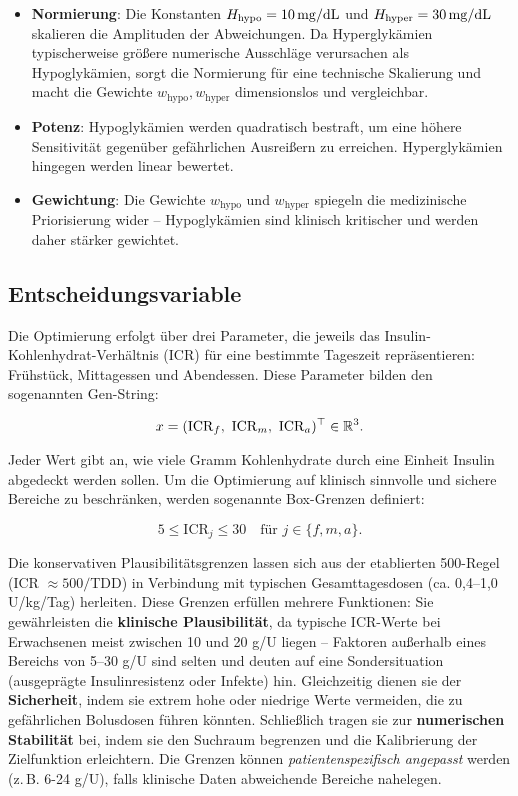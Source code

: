 \begin{itemize}
    \item \textbf{Normierung}: Die Konstanten \(H_{\text{hypo}} = 10\,\mathrm{mg/dL}\) und \(H_{\text{hyper}} = 30\,\mathrm{mg/dL}\) skalieren die Amplituden der Abweichungen. Da Hyperglykämien typischerweise größere numerische Ausschläge verursachen als Hypoglykämien, sorgt die Normierung für eine technische Skalierung und macht die Gewichte \(w_{\mathrm{hypo}}, w_{\mathrm{hyper}}\) dimensionslos und vergleichbar.
    \item \textbf{Potenz}: Hypoglykämien werden quadratisch bestraft, um eine höhere Sensitivität gegenüber gefährlichen Ausreißern zu erreichen. Hyperglykämien hingegen werden linear bewertet.
    \item \textbf{Gewichtung}: Die Gewichte \(w_{\mathrm{hypo}}\) und \(w_{\mathrm{hyper}}\) spiegeln die medizinische Priorisierung wider – Hypoglykämien sind klinisch kritischer und werden daher stärker gewichtet.
\end{itemize}

\subsection{Entscheidungsvariable}

Die Optimierung erfolgt über drei Parameter, die jeweils das Insulin-Kohlenhydrat-Verhältnis (ICR) für eine bestimmte Tageszeit repräsentieren: Frühstück, Mittagessen und Abendessen. Diese Parameter bilden den sogenannten Gen-String:

\[
x = (\mathrm{ICR}_f,\ \mathrm{ICR}_m,\ \mathrm{ICR}_a)^\top \in \mathbb{R}^3.
\]

\noindent Jeder Wert gibt an, wie viele Gramm Kohlenhydrate durch eine Einheit Insulin abgedeckt werden sollen. Um die Optimierung auf klinisch sinnvolle und sichere Bereiche zu beschränken, werden sogenannte Box-Grenzen definiert:

\[
5 \le \mathrm{ICR}_j \le 30 \quad \text{für } j \in \{f,m,a\}.
\]

\noindent Die konservativen Plausibilitätsgrenzen lassen sich aus der etablierten 500-Regel (ICR \(\approx 500/\)TDD) in Verbindung mit typischen Gesamttagesdosen (ca. 0{,}4--1{,}0\,U/kg/Tag) herleiten.
\noindent Diese Grenzen erfüllen mehrere Funktionen: Sie gewährleisten die \textbf{klinische Plausibilität}, da typische ICR-Werte bei Erwachsenen meist zwischen 10 und 20 g/U liegen – Faktoren außerhalb eines Bereichs von 5–30 g/U sind selten und deuten auf eine Sondersituation (ausgeprägte Insulinresistenz oder Infekte) hin\cite{walsh2016pumping,cengiz2022ispad,ada2024standards}. Gleichzeitig dienen sie der \textbf{Sicherheit}, indem sie extrem hohe oder niedrige Werte vermeiden, die zu gefährlichen Bolusdosen führen könnten. Schließlich tragen sie zur \textbf{numerischen Stabilität} bei, indem sie den Suchraum begrenzen und die Kalibrierung der Zielfunktion erleichtern.
\noindent Die Grenzen können \emph{patientenspezifisch angepasst} werden (z.\,B. 6-24 g/U), falls klinische Daten abweichende Bereiche nahelegen.

